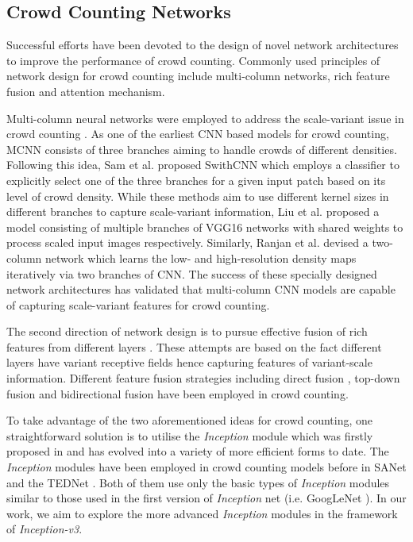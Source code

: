\documentclass[journal,comsoc]{IEEEtran}
\begin{document}
\subsection{Crowd Counting Networks}\label{sec:networks}

Successful efforts have been devoted to the design of novel network architectures to improve the performance of crowd counting. Commonly used principles of network design for crowd counting include multi-column networks, rich feature fusion and attention mechanism.

Multi-column neural networks were employed to address the scale-variant issue in crowd counting \cite{zhang2016single,sam2017switching,cheng2019improving}. As one of the earliest CNN based models for crowd counting,
MCNN \cite{zhang2016single} consists of three branches aiming to handle crowds of different densities. Following this idea, Sam et al. \cite{sam2017switching} proposed SwithCNN which employs a classifier to explicitly select one of the three branches for a given input patch based on its level of crowd density. While these methods aim to use different kernel sizes in different branches to capture scale-variant information, Liu et al. \cite{liu2019crowd} proposed a model consisting of multiple branches of VGG16 networks with shared weights to process scaled input images respectively. Similarly, Ranjan et al. \cite{ranjan2018iterative} devised a two-column network which learns the low- and high-resolution density maps iteratively via two branches of CNN. The success of these specially designed network architectures has validated that multi-column CNN models are capable of capturing scale-variant features for crowd counting.

The second direction of network design is to pursue effective fusion of rich features from different layers \cite{sindagi2019ha,jiang2019crowd}. These attempts are based on the fact different layers have variant receptive fields hence capturing features of variant-scale information. Different feature fusion strategies including direct fusion \cite{sindagi2019ha}, top-down fusion \cite{sam2018top} and bidirectional fusion \cite{sindagi2019multi} have been employed in crowd counting. 

To take advantage of the two aforementioned ideas for crowd counting, one straightforward solution is to utilise the  \textit{Inception}  module \cite{szegedy2016rethinking} which was firstly proposed in \cite{szegedy2015going} and has evolved into a variety of more efficient forms to date. The \textit{Inception} modules have been employed in crowd counting models before in SANet \cite{cao2018scale} and the TEDNet \cite{jiang2019crowd}. Both of them use only the basic types of \textit{Inception} modules similar to those used in the first version of \textit{Inception} net (i.e. GoogLeNet \cite{szegedy2015going}). In our work, we aim to explore the more advanced \textit{Inception} modules in the framework of \textit{Inception-v3}.
\end{document}
